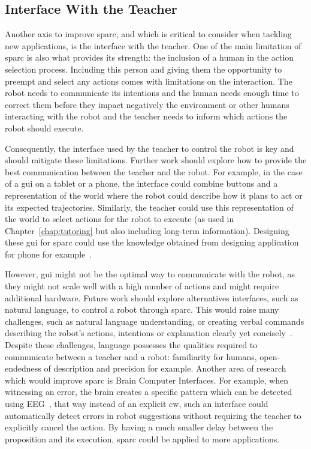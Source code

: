\subsection{Interface With the Teacher}\label{sec:disc_future_interface}

Another axis to improve \gls{sparc}, and which is critical to consider when tackling new applications, is the interface with the teacher. One of the main limitation of \gls{sparc} is also what provides its strength: the inclusion of a human in the action selection process. Including this person and giving them the opportunity to preempt and select any actions comes with limitations on the interaction. The robot needs to communicate its intentions and the human needs enough time to correct them before they impact negatively the environment or other humans interacting with the robot and the teacher needs to inform which actions the robot should execute. 

Consequently, the interface used by the teacher to control the robot is key and should mitigate these limitations. Further work should explore how to provide the best communication between the teacher and the robot. For example, in the case of a \gls{gui} on a tablet or a phone, the interface could combine buttons and a representation of the world where the robot could describe how it plans to act or its expected trajectories. Similarly, the teacher could use this representation of the world to select actions for the robot to execute (as used in Chapter~\ref{chap:tutoring} but also including long-term information). Designing these \gls{gui} for \gls{sparc} could use the knowledge obtained from designing application for phone for example~\citep{joorabchi2013real}. 

However, \gls{gui} might not be the optimal way to communicate with the robot, as they might not scale well with a high number of actions and might require additional hardware. Future work should explore alternatives interfaces, such as natural language, to control a robot through \gls{sparc}. This would raise many challenges, such as natural language understanding, or creating verbal commands describing the robot's actions, intentions or explanation clearly yet concisely~\citep{hayes2017improving}. Despite these challenges, language possesses the qualities required to communicate between a teacher and a robot: familiarity for humans, open-endedness of description and precision for example. Another area of research which would improve \gls{sparc} is Brain Computer Interfaces. For example, when witnessing an error, the brain creates a specific pattern which can be detected using EEG~\citep{gehring1993neural}, that way instead of an explicit \gls{cw}, such an interface could automatically detect errors in robot suggestions without requiring the teacher to explicitly cancel the action. By having a much smaller delay between the proposition and its execution, \gls{sparc} could be applied to more applications.

